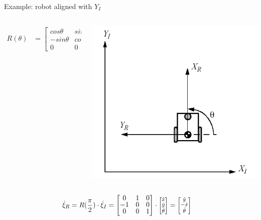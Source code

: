 \documentclass[compress]{beamer}
\newcommand{\colvec}[2][.8]{%
  \scalebox{#1}{%
    \renewcommand{\arraystretch}{.8}%
    $\begin{bmatrix}#2\end{bmatrix}$%
  }
}
\begin{document}
\begin{frame}{Example: robot aligned with $Y_I$}
    \begin{columns}
        \begin{column}{0.6\linewidth}

    \begin{align*}
        R(\theta) &= \begin{bmatrix} cos\theta & sin\theta & 0 \\
                                    -sin\theta & cos\theta & 0 \\
                                             0 &         0 & 1 \end{bmatrix}
    \end{align*}

            
        \end{column}
        \begin{column}{0.4\linewidth}

    \begin{center}
        \includegraphics[width=0.9\linewidth]{robot_position_simple}
    \end{center}
        \end{column}
    \end{columns}


    \begin{align*}
        \dot\xi_R &= R(\frac{\pi}{2})\cdot \dot\xi_I = \begin{bmatrix} 0 & 1 & 0 \\
                                                                      -1 & 0 & 0 \\
                                                                       0 & 0 & 1 \end{bmatrix} \cdot \colvec{\dot{x} \\ \dot{y} \\ \dot\theta} =  \colvec{\dot{y} \\ -\dot{x} \\ \dot\theta} 
    \end{align*}



\end{frame}
\end{document}
